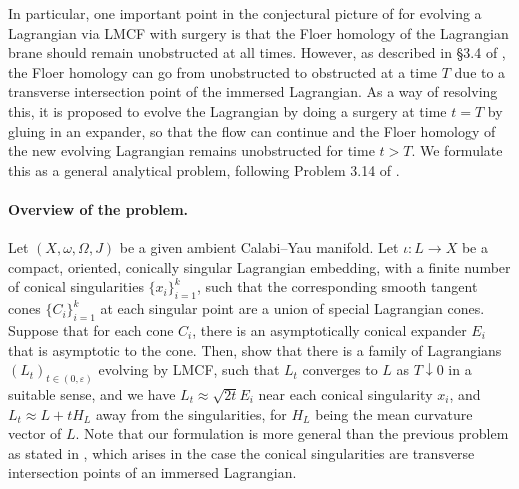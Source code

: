 \documentclass[10pt, a4paper]{article}
\theoremstyle{plain}%
\theoremstyle{definition}
\numberwithin{figure}{section}
\numberwithin{equation}{section}
\newcommand{\ep}{\varepsilon}
\begin{document}
In particular, one important point in the conjectural picture of \cite{Joy15} for evolving a Lagrangian via LMCF with surgery is that the Floer homology of the Lagrangian brane should remain unobstructed at all times. However, as described in \S 3.4 of \cite{Joy15}, the Floer homology can go from unobstructed to obstructed at a time $T$ due to a transverse intersection point of the immersed Lagrangian. As a way of resolving this, it is proposed to evolve the Lagrangian by doing a surgery at time $t=T$ by gluing in an expander, so that the flow can continue and the Floer homology of the new evolving Lagrangian remains unobstructed for time $t>T$. We formulate this as a general analytical problem, following Problem 3.14 of \cite{Joy15}.  

\paragraph*{\textbf{Overview of the problem.}} Let $(X,\omega,\Omega, J)$ be a given ambient Calabi--Yau manifold. Let $\iota: L \rightarrow X$ be a compact, oriented, conically singular Lagrangian embedding, with a finite number of conical singularities $\{x_i\}_{i=1}^k$, such that the corresponding smooth tangent cones $\{C_i\}_{i=1}^k$ at each singular point are a union of special Lagrangian cones. Suppose that for each cone $C_i$, there is an asymptotically conical expander $E_i$ that is asymptotic to the cone. Then, show that there is a family of Lagrangians $(L_t)_{t\in (0,\ep)}$ evolving by LMCF, such that $L_t$ converges to $L$ as $T\downarrow 0$ in a suitable sense, and we have $L_t\approx \sqrt{2t}E_i$ near each conical singularity $x_i$, and $L_t\approx L+tH_L$ away from the singularities, for $H_L$ being the mean curvature vector of $L$. Note that our formulation is more general than the previous problem as stated in \cite{Joy15}, which arises in the case the conical singularities are transverse intersection points of an immersed Lagrangian.
\end{document}
